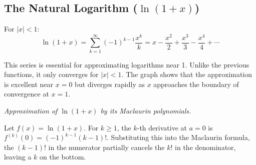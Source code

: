 \subsection{The Natural Logarithm ($\ln(1+x)$)}

\begin{theorembox}
For $|x| < 1$:
$$ \ln(1+x) = \sum_{k=1}^{\infty} (-1)^{k-1} \frac{x^k}{k} = x - \frac{x^2}{2} + \frac{x^3}{3} - \frac{x^4}{4} + \cdots $$
\end{theorembox}

\begin{intuitionbox}
This series is essential for approximating logarithms near 1. Unlike the previous functions, it only converges for $|x|<1$. The graph shows that the approximation is excellent near $x=0$ but diverges rapidly as $x$ approaches the boundary of convergence at $x=1$.

\tcblower

\centering
{}
\par\small\textit{Approximation of $\ln(1+x)$ by its Maclaurin polynomials.}
\end{intuitionbox}

\begin{proofbox}
Let $f(x) = \ln(1+x)$. For $k \ge 1$, the $k$-th derivative at $a=0$ is $f^{(k)}(0) = (-1)^{k-1} (k-1)!$. Substituting this into the Maclaurin formula, the $(k-1)!$ in the numerator partially cancels the $k!$ in the denominator, leaving a $k$ on the bottom.
\end{proofbox}